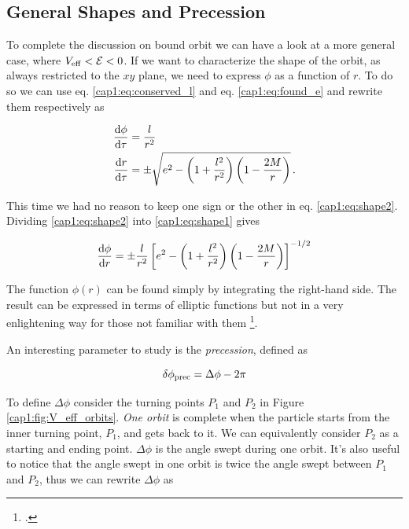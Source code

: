 \subsection{General Shapes and Precession}
\label{cap1:sec:precession}

To complete the discussion on bound orbit we can have a look at a more general
case, where $V_{\rm eff} < \mathcal E < 0$.
If we want to characterize the shape of the orbit, as always restricted to the
$xy$ plane, we need to express $\phi$ as a function of $r$.
To do so we can use eq. \ref{cap1:eq:conserved_l} and eq. \ref{cap1:eq:found_e}
and rewrite them respectively as

\begin{subequations}
\begin{align}
    \dv{\phi}{\tau} &= \frac{l}{r^2} \label{cap1:eq:shape1} \\
    \dv{r}{\tau} &= \pm \sqrt{e^2 - \left(1 + \frac{l^2}{r^2}\right)
    \left(1 - \frac{2M}{r}\right)} \label{cap1:eq:shape2} \, .
\end{align}
\label{cap1:eq:to_find_shape}
\end{subequations}

This time we had no reason to keep one sign or the other in eq.
\ref{cap1:eq:shape2}.
Dividing \ref{cap1:eq:shape2} into \ref{cap1:eq:shape1} gives

\begin{equation}
    \dv{\phi}{r} = \pm \frac{l}{r^2}
    \left[e^2 - \left(1 + \frac{l^2}{r^2}\right)
    \left(1 - \frac{2M}{r}\right)\right]^{-1/2}
    \label{cap1:eq:shape}
\end{equation}

The function $\phi(r)$ can be found simply by integrating the right-hand side.
The result can be expressed in terms of elliptic functions but not in a very
enlightening way for those not familiar with them
\footcite[page 202]{hartle2021gravity}.

An interesting parameter to study is the \textit{precession}, defined as

\begin{equation}
    \delta \phi_{\rm prec} = \Delta \phi - 2 \pi
    \label{cap1:eq:precession}
\end{equation}

To define $\Delta \phi$ consider the turning points $P_1$ and $P_2$ in Figure
\ref{cap1:fig:V_eff_orbits}.
\textit{One orbit} is complete when the particle starts from the inner turning
point, $P_1$, and gets back to it.
We can equivalently consider $P_2$ as a starting and ending point.
$\Delta \phi$ is the angle swept during one orbit.
It's also useful to notice that the angle swept in one orbit is twice the angle
swept between $P_1$ and $P_2$, thus we can rewrite $\Delta \phi$ as

